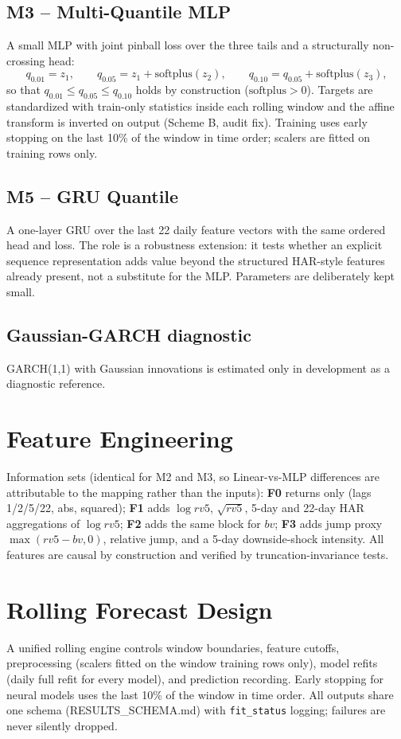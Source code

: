 \documentclass[11pt]{article}
\begin{document}
\subsection{M3 -- Multi-Quantile MLP}
A small MLP with joint pinball loss over the three tails and a structurally non-crossing head:
\begin{equation}
q_{0.01} = z_1, \qquad q_{0.05} = z_1 + \mathrm{softplus}(z_2), \qquad q_{0.10} = q_{0.05} + \mathrm{softplus}(z_3),
\end{equation}
so that $q_{0.01}\le q_{0.05}\le q_{0.10}$ holds by construction ($\mathrm{softplus}>0$). Targets are standardized with train-only statistics inside each rolling window and the affine transform is inverted on output (Scheme B, audit fix). Training uses early stopping on the last 10\% of the window in time order; scalers are fitted on training rows only.

\subsection{M5 -- GRU Quantile}
A one-layer GRU over the last 22 daily feature vectors with the same ordered head and loss. The role is a robustness extension: it tests whether an explicit sequence representation adds value beyond the structured HAR-style features already present, not a substitute for the MLP. Parameters are deliberately kept small.

\subsection{Gaussian-GARCH diagnostic}
GARCH(1,1) with Gaussian innovations is estimated only in development as a diagnostic reference.

\section{Feature Engineering}
Information sets (identical for M2 and M3, so Linear-vs-MLP differences are attributable to the mapping rather than the inputs): \textbf{F0} returns only (lags 1/2/5/22, abs, squared); \textbf{F1} adds $\log rv5$, $\sqrt{rv5}$, 5-day and 22-day HAR aggregations of $\log rv5$; \textbf{F2} adds the same block for $bv$; \textbf{F3} adds jump proxy $\max(rv5-bv,0)$, relative jump, and a 5-day downside-shock intensity. All features are causal by construction and verified by truncation-invariance tests.

\section{Rolling Forecast Design}
A unified rolling engine controls window boundaries, feature cutoffs, preprocessing (scalers fitted on the window training rows only), model refits (daily full refit for every model), and prediction recording. Early stopping for neural models uses the last 10\% of the window in time order. All outputs share one schema (RESULTS\_SCHEMA.md) with \texttt{fit\_status} logging; failures are never silently dropped.
\end{document}
